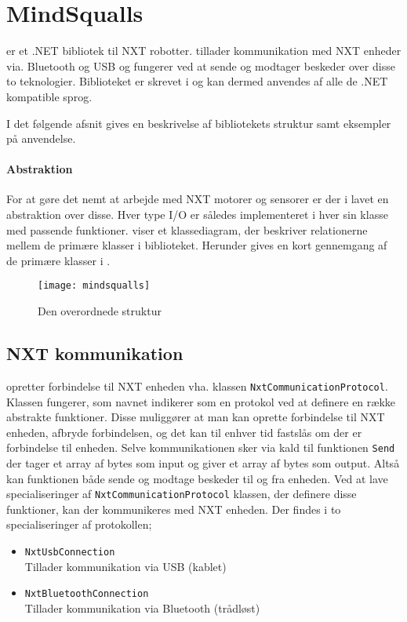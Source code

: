 \section{MindSqualls}\label{mindsqualls}
\mindsqualls er et .NET bibliotek til \legos NXT robotter.
\mindsqualls tillader kommunikation med NXT enheder via. Bluetooth og USB og fungerer ved at sende og modtager beskeder over disse to teknologier.
Biblioteket er skrevet i \csharp og kan dermed anvendes af alle de .NET kompatible sprog.

I det følgende afsnit gives en beskrivelse af bibliotekets struktur samt eksempler på anvendelse.

\paragraph{Abstraktion}
For at gøre det nemt at arbejde med NXT motorer og sensorer er der i \mindsqualls lavet en abstraktion over disse.
Hver type I/O er således implementeret i hver sin klasse med passende funktioner.
 viser et klassediagram, der beskriver relationerne mellem de primære klasser i \mindsqualls biblioteket.
Herunder gives en kort gennemgang af de primære klasser i \mindsqualls.

\begin{figure}
\centering
\texttt{[image: mindsqualls]}
\caption{Den overordnede \mindsqualls struktur}
\label{mindsqualls:structure}
\end{figure}

\subsection{NXT kommunikation}
\mindsqualls opretter forbindelse til NXT enheden vha. klassen \lstinline[style=csharp]!NxtCommunicationProtocol!.
Klassen fungerer, som navnet indikerer som en protokol ved at definere en række abstrakte funktioner.
Disse muliggører at man kan oprette forbindelse til NXT enheden, afbryde forbindelsen, og det kan til enhver tid fastslås om der er forbindelse til enheden.
Selve kommunikationen sker via kald til funktionen \lstinline[style=csharp]!Send! der tager et array af bytes som input og giver et array af bytes som output.
Altså kan funktionen både sende og modtage beskeder til og fra enheden.
Ved at lave specialiseringer af \lstinline[style=csharp]!NxtCommunicationProtocol! klassen, der definere disse funktioner, kan der kommunikeres med NXT enheden.
Der findes i \mindsqualls to specialiseringer af protokollen;
\begin{itemize}
\item \lstinline[style=csharp]!NxtUsbConnection!\\
Tillader kommunikation via USB (kablet)
\item \lstinline[style=csharp]!NxtBluetoothConnection!\\
Tillader kommunikation via Bluetooth (trådløst)
\end{itemize}

